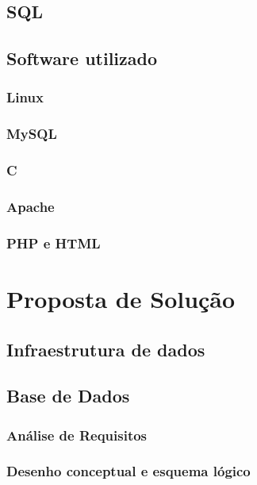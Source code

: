 \documentclass[11pt,twoside,a4paper]{report}
\begin{document}
\section{SQL}


\section{Software utilizado}
\subsection{Linux}

\subsection{MySQL}

\subsection{C}

\subsection{Apache}

\subsection{PHP e HTML}

\cleardoublepage
\chapter{Proposta de Solução}
\section{Infraestrutura de dados}

\section{Base de Dados}
\subsection{Análise de Requisitos}

\subsection{Desenho conceptual e esquema lógico}
\end{document}
